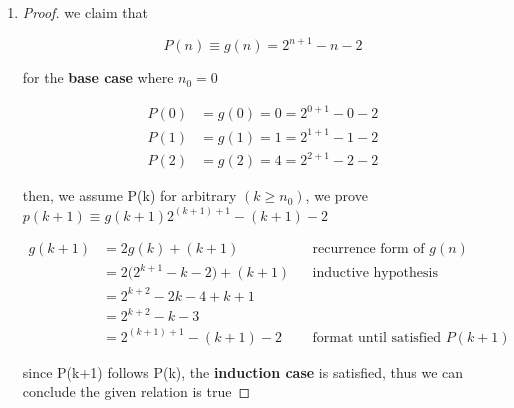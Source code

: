\documentclass{article}
\theoremstyle{remark}
\begin{document}
\begin{enumerate}
        since $f(n) = 2^n - 1$, as hinted (tower of hanoi), we got

        \[
        g(n) = 2(2^n - 1) - n
        \]

        \[
        \boxed{g(n) = 2^{n+1} - n - 2}
        \]

    \item[(iv)] 
    \begin{proof} 
    we claim that

    \[
    P(n) \equiv g(n) = 2^{n+1} - n - 2
    \]

    for the \textbf{base case} where $n_0 = 0$

    \[
    \begin{aligned}
    P(0) &= g(0) = 0 = 2^{0+1} - 0 - 2 \\
    P(1) &= g(1) = 1 = 2^{1+1} - 1 - 2 \\
    P(2) &= g(2) = 4 = 2^{2+1} - 2 - 2
    \end{aligned}
    \]

    then, we assume P(k) for arbitrary $(k \ge n_0)$, we prove $p(k+1) \equiv g(k+1) 2^{(k+1)+1} - (k+1) - 2$

    \begin{align*}
    g(k+1) &= 2g(k) + (k+1) && \text{recurrence form of } g(n)\\
    &= 2\big(2^{k+1} - k - 2\big) + (k+1) && \text{inductive hypothesis}\\
    &= 2^{k+2} - 2k - 4 + k + 1\\
    &= 2^{k+2} - k - 3\\
    &= 2^{(k+1)+1} - (k+1) - 2 && \text{format until satisfied } P(k+1)
    \end{align*}

    since P(k+1) follows P(k), the \textbf{induction case} is satisfied, thus we can conclude the given relation is true 
    \end{proof}

    \end{enumerate}
\end{document}
